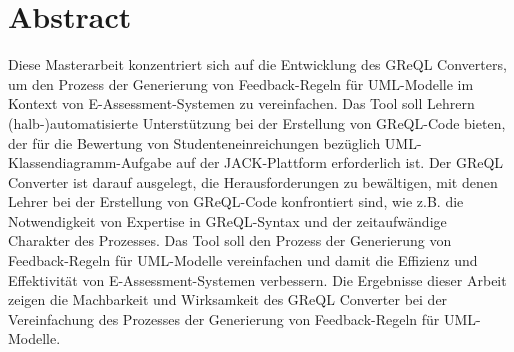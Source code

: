 {\let\clearpage\relax \chapter*{Abstract}}
Diese Masterarbeit konzentriert sich auf die Entwicklung des GReQL Converters, um den Prozess der Generierung
von Feedback-Regeln für UML-Modelle im Kontext von E-Assessment-Systemen zu vereinfachen. Das Tool soll Lehrern
(halb-)automatisierte Unterstützung bei der Erstellung von GReQL-Code bieten, der für die Bewertung von
Studenteneinreichungen bezüglich UML-Klassendiagramm-Aufgabe auf der JACK-Plattform erforderlich ist.
Der GReQL Converter ist darauf ausgelegt, die Herausforderungen zu bewältigen, mit denen Lehrer bei der
Erstellung von GReQL-Code konfrontiert sind, wie z.B. die Notwendigkeit von Expertise in GReQL-Syntax und der
zeitaufwändige Charakter des Prozesses. Das Tool soll den Prozess der Generierung von Feedback-Regeln für
UML-Modelle vereinfachen und damit die Effizienz und Effektivität von E-Assessment-Systemen verbessern. Die Ergebnisse
dieser Arbeit zeigen die Machbarkeit und Wirksamkeit des GReQL Converter bei der Vereinfachung des Prozesses der
Generierung von Feedback-Regeln für UML-Modelle.